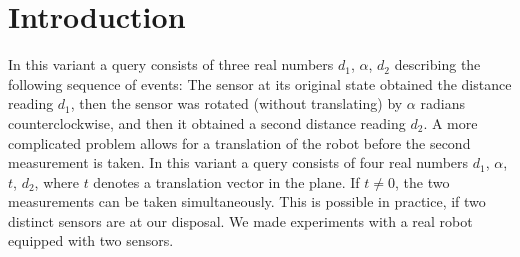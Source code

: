 \section{Introduction}
\label{sec:intro}
In this variant a query consists of three real numbers $d_1$, $\alpha$, $d_2$ describing the following sequence of events: The sensor at its original state obtained the distance reading $d_1$, then the sensor was rotated (without translating) by $\alpha$ radians counterclockwise, and then it obtained a second distance reading $d_2$. A more complicated problem allows for a translation of the robot before the second measurement is taken. In this variant a query consists of four real numbers $d_1$, $\alpha$, $t$, $d_2$, where $t$ denotes a translation vector in the plane. If $t \neq 0$, the two measurements can be taken simultaneously. This is possible in practice, if two distinct sensors are at our disposal. We made experiments with a real robot equipped with two sensors.
